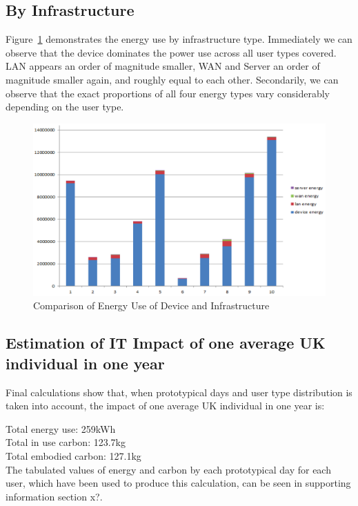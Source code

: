 \documentclass[conference]{IEEEtran}
\begin{document}
\subsection{By Infrastructure}

Figure~\ref{fig:energyusecomparison} demonstrates the energy use by
infrastructure type.  Immediately we can observe that the device
dominates the power use across all user types covered. LAN appears an
order of magnitude smaller, WAN and Server an order of magnitude
smaller again, and roughly equal to each other. Secondarily, we can
observe that the exact proportions of all four energy types vary
considerably depending on the user type.

\begin{figure}[!htp]
\centering
\includegraphics[width=\columnwidth]{images/energyuse_comparison.png}
\caption{Comparison of Energy Use of Device and Infrastructure}
\label{fig:energyusecomparison} 
\end{figure}

\subsection{Estimation of IT Impact of one average UK individual in
  one year}

Final calculations show that, when prototypical days and user type
distribution is taken into account, the impact of one average UK
individual in one year is:

Total energy use: 259kWh\\
Total in use carbon: 123.7kg\\
Total embodied carbon: 127.1kg\\

The tabulated values of energy and carbon by each prototypical day for
each user, which have been used to produce this calculation, can be
seen in supporting information section x?.
\end{document}
